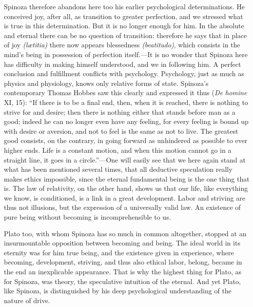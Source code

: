 \documentclass[12pt]{book}
\newcommand{\opage}[1]{\marginnote{\footnotesize\textit{[#1]}}}
\begin{document}
Spinoza therefore abandons here too his earlier psychological determinations. He
conceived joy, after all, as transition to greater perfection, and we stressed what is
true in this determination. But it is no longer enough for him. In the absolute and
eternal there can be no question of transition: therefore he says that in place of joy
\textit{(lætitia)} there now appears blessedness \textit{(beatitudo)}, which consists in
the mind's being in possession of perfection itself.---It is no wonder that Spinoza here
has difficulty in making himself understood, and we in following him. A perfect
conclusion and fulfillment conflicts with psychology. Psychology, just as much as physics
and physiology, knows only relative forms of state. Spinoza's contemporary Thomas Hobbes
saw this clearly and expressed it thus (\textit{De homine} \opage{144}XI, 15): ``If there
is to be a final end, then, when it is reached, there is nothing to strive for and
desire; then there is nothing either that stands before man as a good; indeed he can no
longer even have any feeling, for every feeling is bound up with desire or aversion, and
not to feel is the same as not to live. The greatest good consists, on the contrary, in
going forward as unhindered as possible to ever higher ends. Life is a constant motion,
and when this motion cannot go in a straight line, it goes in a circle.''---One will
easily see that we here again stand at what has been mentioned several times, that all
deductive speculation really makes ethics impossible, since the eternal fundamental being
is the one thing that is. The law of relativity, on the other hand, shows us that our
life, like everything we know, is conditioned, is a link in a great development. Labor
and striving are thus not illusions, but the expression of a universally valid law. An
existence of pure being without becoming is incomprehensible to us.

Plato too, with whom Spinoza has so much in common altogether, stopped at an
insurmountable opposition between becoming and being. The ideal world in its eternity
was for him true being, and the existence given in experience, where becoming,
development, striving, and thus also ethical labor, belong, became in the end an
inexplicable appearance. That is why the highest thing for Plato, as for Spinoza, was
theory, the speculative intuition of the eternal. And yet Plato, like Spinoza, is
distinguished by his deep psychological understanding of the nature of drive.
\end{document}
